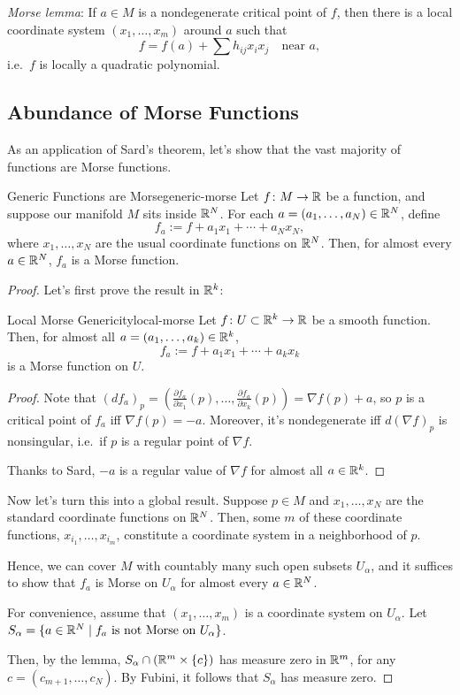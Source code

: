 \emph{Morse lemma}: If $a \in M$ is a nondegenerate critical point of $f$, then there is a local coordinate system $(x_1, \ldots, x_m)$ around $a$ such that
\[
    f = f(a) + \sum h_{ij} x_i x_j \quad \text{near } a,
\]
i.e.\ $f$ is locally a quadratic polynomial.

\subsection{Abundance of Morse Functions}

As an application of Sard's theorem, let's show that the vast majority of functions are Morse functions.

\begin{theorem}{Generic Functions are Morse}{generic-morse}
    Let $f \colon M \to \mathbb{R}$ be a function, and suppose our manifold $M$ sits inside $\mathbb{R}^N$. For each $a = (a_1, \ldots, a_N) \in \mathbb{R}^N$, define
    \[
        f_a := f + a_1 x_1 + \cdots + a_N x_N,
    \]
    where $x_1, \ldots, x_N$ are the usual coordinate functions on $\mathbb{R}^N$. Then, for almost every $a \in \mathbb{R}^N$, $f_a$ is a Morse function.
\end{theorem}

\begin{proof}
    Let's first prove the result in $\mathbb{R}^k$:

    \begin{lemma}{Local Morse Genericity}{local-morse}
        Let $f \colon U \subset \mathbb{R}^k \to \mathbb{R}$ be a smooth function. Then, for almost all $a = (a_1, \ldots, a_k) \in \mathbb{R}^k$,
        \[
            f_a := f + a_1 x_1 + \cdots + a_k x_k
        \]
        is a Morse function on $U$.
    \end{lemma}

    \begin{proof}
        Note that $(df_a)_p = \left(\frac{\partial f_a}{\partial x_1}(p), \ldots, \frac{\partial f_a}{\partial x_k}(p)\right) = \nabla f(p) + a$, so $p$ is a critical point of $f_a$ iff $\nabla f(p) = -a$. Moreover, it's nondegenerate iff $d(\nabla f)_p$ is nonsingular, i.e.\ if $p$ is a regular point of $\nabla f$.

        Thanks to Sard, $-a$ is a regular value of $\nabla f$ for almost all $a \in \mathbb{R}^k$.
    \end{proof}

    Now let's turn this into a global result. Suppose $p \in M$ and $x_1, \ldots, x_N$ are the standard coordinate functions on $\mathbb{R}^N$. Then, some $m$ of these coordinate functions, $x_{i_1}, \ldots, x_{i_m}$, constitute a coordinate system in a neighborhood of $p$.

    Hence, we can cover $M$ with countably many such open subsets $U_\alpha$, and it suffices to show that $f_a$ is Morse on $U_\alpha$ for almost every $a \in \mathbb{R}^N$.

    For convenience, assume that $(x_1, \ldots, x_m)$ is a coordinate system on $U_\alpha$. Let $S_\alpha = \{a \in \mathbb{R}^N \mid f_a \text{ is not Morse on } U_\alpha\}$.

    Then, by the lemma, $S_\alpha \cap (\mathbb{R}^m \times \{c\})$ has measure zero in $\mathbb{R}^m$, for any $c = (c_{m+1}, \ldots, c_N)$. By Fubini, it follows that $S_\alpha$ has measure zero.
\end{proof}

